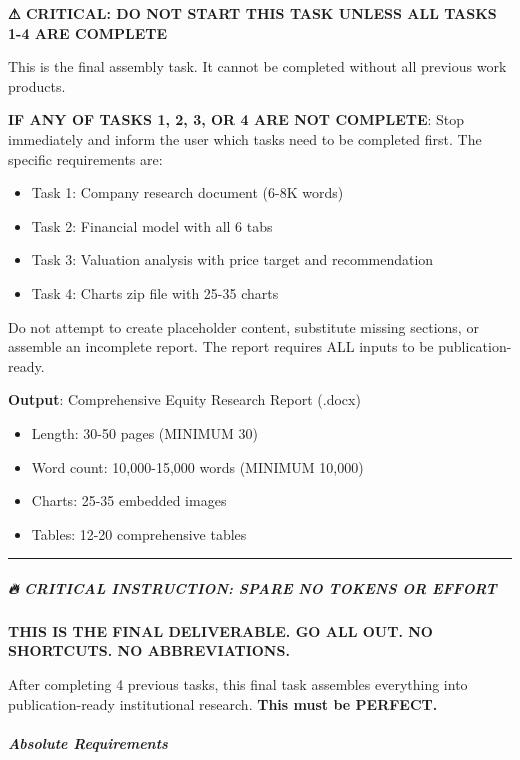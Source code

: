 \documentclass[11pt]{article}
\begin{document}
\textbf{⚠ CRITICAL: DO NOT START THIS TASK UNLESS ALL TASKS 1-4 ARE COMPLETE}


This is the final assembly task. It cannot be completed without all previous work products.


\textbf{IF ANY OF TASKS 1, 2, 3, OR 4 ARE NOT COMPLETE}: Stop immediately and inform the user which tasks need to be completed first. The specific requirements are:

\begin{itemize}[leftmargin=*,itemsep=2pt,topsep=2pt]
\item {} Task 1: Company research document (6-8K words)
\item {} Task 2: Financial model with all 6 tabs
\item {} Task 3: Valuation analysis with price target and recommendation
\item {} Task 4: Charts zip file with 25-35 charts
\end{itemize}

Do not attempt to create placeholder content, substitute missing sections, or assemble an incomplete report. The report requires ALL inputs to be publication-ready.


\textbf{Output}: Comprehensive Equity Research Report (.docx)

\begin{itemize}[leftmargin=*,itemsep=2pt,topsep=2pt]
\item {} Length: 30-50 pages (MINIMUM 30)
\item {} Word count: 10,000-15,000 words (MINIMUM 10,000)
\item {} Charts: 25-35 embedded images
\item {} Tables: 12-20 comprehensive tables
\end{itemize}

\vspace{0.5em}\hrule\vspace{0.5em}

\subparagraph{🔥 CRITICAL INSTRUCTION: SPARE NO TOKENS OR EFFORT}\mbox{}\par

\textbf{THIS IS THE FINAL DELIVERABLE. GO ALL OUT. NO SHORTCUTS. NO ABBREVIATIONS.}


After completing 4 previous tasks, this final task assembles everything into publication-ready institutional research. \textbf{This must be PERFECT.}


\subparagraph{Absolute Requirements}\mbox{}\par
\end{document}
